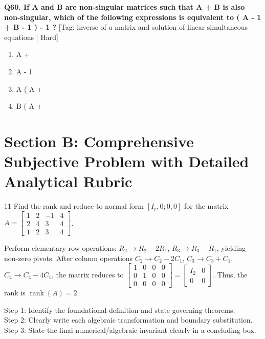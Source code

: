 \noindent\textbf{Q60. If A and B are non-singular matrices such that A + B is also non-singular, which of the following expressions is equivalent to ( A - 1 + B - 1 ) - 1 ?} \hfill [Tag: inverse of a matrix and solution of linear simultaneous equations | Hard]
\begin{enumerate}[label=(\alph*),topsep=2pt,itemsep=1pt,partopsep=0pt,parsep=0pt]
    \item {{A +}}
    \item {{A - 1}}
    \item {{A ( A +}}
    \item {{B ( A +}}
\end{enumerate}
\vspace{2mm}


\section{Section B: Comprehensive Subjective Problem with Detailed Analytical Rubric}

\begin{subjectiveq}{1}{1}
Find the rank and reduce to normal form $[I_r, 0; 0, 0]$ for the matrix $A = \begin{bmatrix} 1 & 2 & -1 & 4 \\ 2 & 4 & 3 & 4 \\ 1 & 2 & 3 & 4 \end{bmatrix}$.
\end{subjectiveq}

\begin{solbox}
Perform elementary row operations: $R_2 \to R_2 - 2R_1$, $R_3 \to R_3 - R_1$, yielding non-zero pivots. After column operations $C_2 \to C_2 - 2C_1$, $C_3 \to C_3 + C_1$, $C_4 \to C_4 - 4C_1$, the matrix reduces to $\begin{bmatrix} 1 & 0 & 0 & 0 \\ 0 & 1 & 0 & 0 \\ 0 & 0 & 0 & 0 \end{bmatrix} = \begin{bmatrix} I_2 & 0 \\ 0 & 0 \end{bmatrix}$. Thus, the rank is $\operatorname{rank}(A) = 2$.
\end{solbox}

\begin{examinertip}
Step 1: Identify the foundational definition and state governing theorems.\\
Step 2: Clearly write each algebraic transformation and boundary substitution.\\
Step 3: State the final numerical/algebraic invariant clearly in a concluding box.
\end{examinertip}
